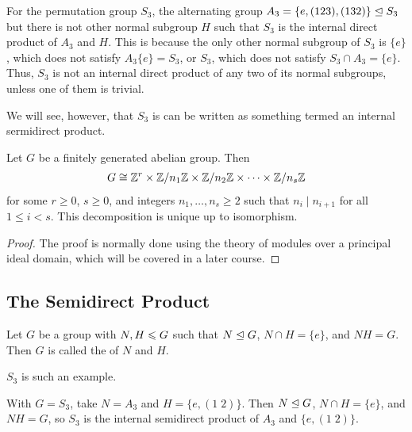 \begin{example}
    For the permutation group $S_{3}$, the alternating group $A_{3} = \{e,(123),(132)\} \trianglelefteq S_{3}$ but there is not other normal subgroup $H$ such that $S_{3}$ is the internal direct product of $A_{3}$ and $H$. This is because the only other normal subgroup of $S_{3}$ is $\{e\}$, which does not satisfy $A_{3}\{e\} = S_{3}$, or $S_{3}$, which does not satisfy $S_{3} \cap A_{3} = \{e\}$. Thus, $S_{3}$ is not an internal direct product of any two of its normal subgroups, unless one of them is trivial.
\end{example}

We will see, however, that $S_{3}$ is can be written as something termed an internal sermidirect product.

\begin{theorem}
    Let $G$ be a finitely generated abelian group. Then
    \begin{align}
        G \cong \mathbb{Z}^{r} \times \mathbb{Z}/n_{1}\mathbb{Z} \times \mathbb{Z}/n_{2}\mathbb{Z} \times \cdots \times \mathbb{Z}/n_{s}\mathbb{Z}
    \end{align}
    for some $r \geq 0$, $s \geq 0$, and integers $n_{1},\ldots,n_{s} \geq 2$ such that $n_{i} \mid n_{i+1}$ for all $1 \leq i < s$. This decomposition is unique up to isomorphism.
\end{theorem}
\begin{proof}
    The proof is normally done using the theory of modules over a principal ideal domain, which will be covered in a later course.
\end{proof}


\subsection{The Semidirect Product}

\begin{definition}
    Let $G$ be a group with $N,H \leqslant G$ such that $N \trianglelefteq G$, $N \cap H = \{e\}$, and $NH = G$. Then $G$ is called the  of $N$ and $H$.
\end{definition}

$S_{3}$ is such an example.

\begin{example}
    With $G = S_{3}$, take $N = A_{3}$ and $H = \{e,(1\;2)\}$. Then $N \trianglelefteq G$, $N \cap H = \{e\}$, and $NH = G$, so $S_{3}$ is the internal semidirect product of $A_{3}$ and $\{e,(1\;2)\}$.
\end{example}

